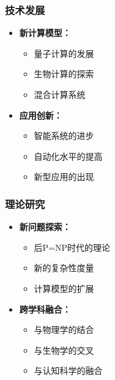 \documentclass[a4paper,12pt]{ctexart}
\begin{document}
\subsubsection{技术发展}
\begin{itemize}
    \item \textbf{新计算模型：}
        \begin{itemize}
            \item 量子计算的发展
            \item 生物计算的探索
            \item 混合计算系统
        \end{itemize}
    \item \textbf{应用创新：}
        \begin{itemize}
            \item 智能系统的进步
            \item 自动化水平的提高
            \item 新型应用的出现
        \end{itemize}
\end{itemize}

\subsubsection{理论研究}
\begin{itemize}
    \item \textbf{新问题探索：}
        \begin{itemize}
            \item 后P=NP时代的理论
            \item 新的复杂性度量
            \item 计算模型的扩展
        \end{itemize}
    \item \textbf{跨学科融合：}
        \begin{itemize}
            \item 与物理学的结合
            \item 与生物学的交叉
            \item 与认知科学的融合
        \end{itemize}
\end{itemize}
\end{document}
